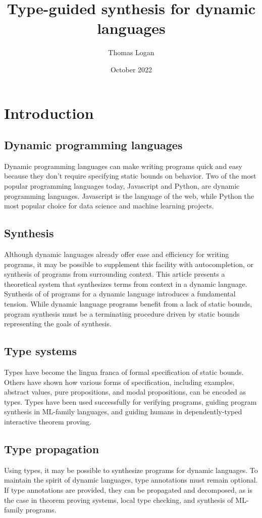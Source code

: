 \documentclass[]{acmart}
\title{Type-guided synthesis for dynamic languages}
\author{Thomas Logan}
\date{October 2022}
\begin{document}
\maketitle

\section{Introduction}

\subsection*{Dynamic programming languages}
Dynamic programming languages can make writing programs quick and easy 
because they don't require specifying static bounds on behavior.
Two of the most popular programming languages today, Javascript and Python,  are 
dynamic programming languages. 
Javascript is the language of the web, while Python the most popular choice
for data science and machine learning projects. 


\subsection*{Synthesis}
Although dynamic languages already offer ease and efficiency for writing programs, it
may be possible to supplement this facility with autocompletion,
or synthesis of programs from surrounding context. 
This article presents a theoretical system that synthesizes terms from context 
in a dynamic language.
Synthesis of of programs for a dynamic language introduces a fundamental tension. 
While dynamic language programs benefit from a lack of static bounds, program synthesis
must be a terminating procedure driven by static bounds representing the goals of synthesis.   

\subsection*{Type systems}
Types have become the lingua franca of formal specification of static bounds.
Others have shown how various forms of specification, including examples, abstract values, 
pure propositions, and modal propositions, can be encoded as types.
Types have been used successfully for verifying programs, 
guiding program synthesis in ML-family languages, 
and guiding humans in dependently-typed interactive theorem proving. 

\subsection*{Type propagation}
Using types, it may be possible to synthesize programs for dynamic languages.
To maintain the spirit of dynamic languages, type annotations must remain optional.
If type annotations are provided, they can be propagated and decomposed, 
as is the case in theorem proving systems, local type checking, 
and synthesis of ML-family programs.
\end{document}
